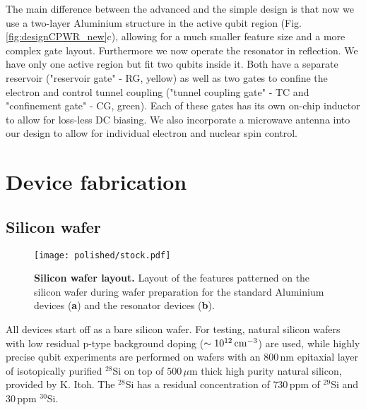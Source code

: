 The main difference between the advanced and the simple design is that now we use a two-layer Aluminium structure in the active qubit region (Fig. \ref{fig:designCPWR_new}c), allowing for a much smaller feature size and a more complex gate layout. Furthermore we now operate the resonator in reflection. We have only one active region but fit two qubits inside it. Both have a separate reservoir ("reservoir gate" - RG, yellow) as well as two gates to confine the electron and control tunnel coupling ("tunnel coupling gate" - TC and "confinement gate" - CG, green). Each of these gates has its own on-chip inductor to allow for loss-less DC biasing. We also incorporate a microwave antenna into our design to allow for individual electron and nuclear spin control. 

\section{Device fabrication} \label{sec:fabrication}

\subsection{Silicon wafer} \label{sec:fabWafer}

\begin{figure}
	\centering
	\texttt{[image: polished/stock.pdf]}
	\caption[Silicon wafer layout]{\textbf{Silicon wafer layout.} Layout of the features patterned on the silicon wafer during wafer preparation for the standard Aluminium devices (\textbf{a}) and the resonator devices (\textbf{b}). 
	 }
	\label{fig:wafer}
\end{figure}

All devices start off as a bare silicon wafer. For testing, natural silicon wafers with low residual p-type background doping ($\sim 10^{12}\,\rm{cm}^{-3}$) are used, while highly precise qubit experiments are performed on wafers with an $800\,$nm epitaxial layer of isotopically purified $^{28}$Si on top of $500\,\mu$m thick high purity natural silicon, provided by K. Itoh. The $^{28}$Si has a residual concentration of $730\,$ppm of $^{29}$Si and $30\,$ppm $^{30}$Si.

